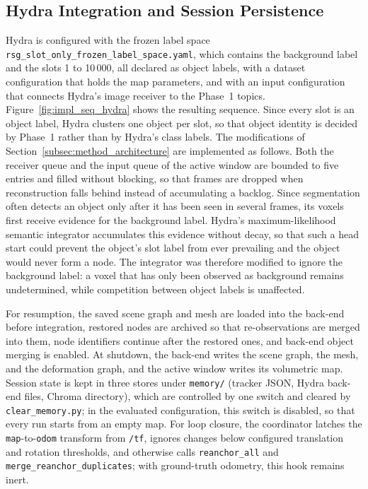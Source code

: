 \subsection{Hydra Integration and Session Persistence}
\label{subsec:impl_hydra}

{\small Hydra is configured with the frozen label space \texttt{rsg\_\allowbreak{}slot\_\allowbreak{}only\_\allowbreak{}frozen\_\allowbreak{}label\_\allowbreak{}space.\allowbreak{}yaml}, which contains the background label and the slots 1 to 10\,000, all declared as object labels, with a dataset configuration that holds the map parameters, and with an input configuration that connects Hydra's image receiver to the Phase~1 topics. Figure~\ref{fig:impl_seq_hydra} shows the resulting sequence. Since every slot is an object label, Hydra clusters one object per slot, so that object identity is decided by Phase~1 rather than by Hydra's class labels. The modifications of Section~\ref{subsec:method_architecture} are implemented as follows. Both the receiver queue and the input queue of the active window are bounded to five entries and filled without blocking, so that frames are dropped when reconstruction falls behind instead of accumulating a backlog. Since segmentation often detects an object only after it has been seen in several frames, its voxels first receive evidence for the background label. Hydra's maximum-likelihood semantic integrator accumulates this evidence without decay, so that such a head start could prevent the object's slot label from ever prevailing and the object would never form a node. The integrator was therefore modified to ignore the background label: a voxel that has only been observed as background remains undetermined, while competition between object labels is unaffected.
\par}

{\small For resumption, the saved scene graph and mesh are loaded into the back-end before integration, restored nodes are archived so that re-observations are merged into them, node identifiers continue after the restored ones, and back-end object merging is enabled. At shutdown, the back-end writes the scene graph, the mesh, and the deformation graph, and the active window writes its volumetric map. Session state is kept in three stores under \texttt{memory/} (tracker JSON, Hydra back-end files, Chroma directory), which are controlled by one switch and cleared by \texttt{clear\_\allowbreak{}memory.\allowbreak{}py}; in the evaluated configuration, this switch is disabled, so that every run starts from an empty map. For loop closure, the coordinator latches the \texttt{map}-to-\texttt{odom} transform from \texttt{/\allowbreak{}tf}, ignores changes below configured translation and rotation thresholds, and otherwise calls \texttt{reanchor\_\allowbreak{}all} and \texttt{merge\_\allowbreak{}reanchor\_\allowbreak{}duplicates}; with ground-truth odometry, this hook remains inert.\par}

